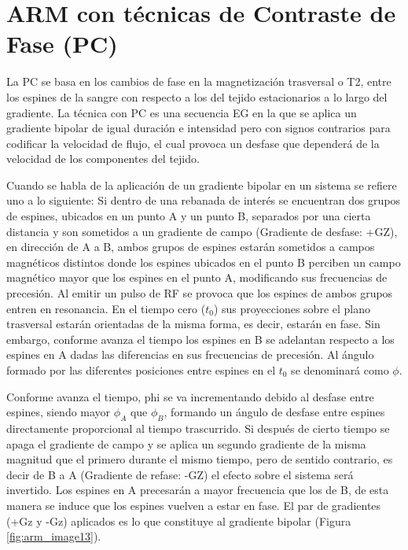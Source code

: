\section{ARM con técnicas de Contraste de Fase (PC)}
La PC se basa en los cambios de fase en la magnetización trasversal o T2, entre los espines de la sangre con respecto a los del tejido estacionarios a lo largo del gradiente. La técnica con PC es una secuencia EG en la que se aplica un gradiente bipolar de igual duración e intensidad pero con signos contrarios para codificar la velocidad de flujo, el cual provoca un desfase que dependerá de la velocidad de los componentes del tejido.

Cuando se habla de la aplicación de un gradiente bipolar en un sistema se refiere uno a lo siguiente: Si dentro de una rebanada de interés se encuentran dos grupos de espines, ubicados en un punto A y un punto B, separados por una cierta distancia y son sometidos a un gradiente de campo (Gradiente de desfase: +GZ), en dirección de A a B, ambos grupos de espines estarán sometidos a campos magnéticos distintos donde los espines ubicados en el punto B perciben un campo magnético mayor que los espines en el punto A, modificando sus frecuencias de precesión. Al emitir un pulso de RF se provoca que los espines de ambos grupos entren en resonancia. En el tiempo cero ($t_0$) sus proyecciones sobre el plano trasversal estarán orientadas de la misma forma, es decir, estarán en fase. Sin embargo, conforme avanza el tiempo los espines en B se adelantan respecto a los espines en A dadas las diferencias en sus frecuencias de precesión. Al ángulo formado por las diferentes posiciones entre espines en el $t_0$ se denominará como $\phi$. 

Conforme avanza el tiempo, phi se va incrementando debido al desfase entre espines, siendo mayor $\phi_A$ que $\phi_B$, formando un ángulo de desfase entre espines directamente proporcional al tiempo trascurrido. Si después de cierto tiempo se apaga el gradiente de campo y se aplica un segundo gradiente de la misma magnitud que el primero durante el mismo tiempo, pero de sentido contrario, es decir de B a A (Gradiente de refase: -GZ) el efecto sobre el sistema será invertido. Los espines en A precesarán a mayor frecuencia que los de B, de esta manera se induce que los espines vuelven a estar en fase. El par de gradientes (+Gz y -Gz) aplicados es lo que constituye al gradiente bipolar (Figura \ref{fig:arm_image13}). 


